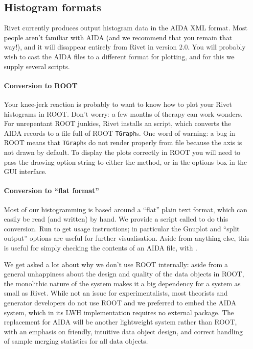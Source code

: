 \subsection{Histogram formats}

Rivet currently produces output histogram data in the AIDA XML format. Most
people aren't familiar with AIDA (and we recommend that you remain that way!),
and it will disappear entirely from Rivet in version 2.0. You will probably
wish to cast the AIDA files to a different format for plotting, and for this we
supply several scripts.

\paragraph{Conversion to ROOT}

Your knee-jerk reaction is probably to want to know how to plot your Rivet
histograms in ROOT\cite{Antcheva:2009zz}. Don't worry: a few months of therapy
can work wonders. For unrepentant ROOT junkies, Rivet installs an
 script, which converts the AIDA records to a  file
full of ROOT \texttt{TGraph}s. One word of warning: a bug in ROOT means that
\texttt{TGraph}s do not render properly from file because the axis is not drawn by
default. To display the plots correctly in ROOT you will need to pass the
 drawing option string to either the  method, or
in the options box in the  GUI interface.

\paragraph{Conversion to ``flat format''}

Most of our histogramming is based around a ``flat'' plain text format,
which can easily be read (and written) by hand. We provide a script called
 to do this conversion. Run  to get usage
instructions; in particular the Gnuplot and ``split output'' options are useful
for further visualisation. Aside from anything else, this is useful for simply
checking the contents of an AIDA file, with .

\vspace{1.8em}

\begin{detail}
  We get asked a lot about why we don't use ROOT internally: aside from a
  general unhappiness about the design and quality of the data objects in ROOT,
  the monolithic nature of the system makes it a big dependency for a system as
  small as Rivet. While not an issue for experimentalists, most theorists and
  generator developers do not use ROOT and we preferred to embed the AIDA
  system, which in its LWH implementation requires no external package. The
  replacement for AIDA will be another lightweight system rather than ROOT, with
  an emphasis on friendly, intuitive data object design, and correct handling of
  sample merging statistics for all data objects.
\end{detail}

